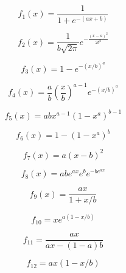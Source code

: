 \documentclass[14pt]{amsart}
\title{}
\author{}
\begin{document}

\clearpage
\vspace{-2in}
$$
f_1(x) = \frac{1}{1+e^{-(ax+b)}}
$$
\clearpage

\vspace{-2in}
$$
f_2(x) = \frac{1}{b \sqrt{2\pi}}e^{-\frac{(x-a)^2}{2b^2}}
$$
\clearpage

\vspace{-2in}

$$
f_3(x) = 1-e^{-(x/b)^a}
$$
\clearpage

\vspace{-2in}
$$
f_4(x) = \frac{a}{b}\left(\frac{x}{b}\right)^{a-1} e^{-(x/b)^a}
$$
\clearpage

\vspace{-2in}
$$
f_5(x) =abx^{a-1}(1-x^a)^{b-1}
$$
\clearpage

\vspace{-2in}
$$
f_6(x) =  1-(1-x^a)^b
$$
\clearpage

\vspace{-2in}
$$
f_7(x) = a(x-b)^2
$$

\clearpage

\vspace{-2in}
$$
f_8(x) = abe^{ax}e^{b}e^{-b e^{ax}}
$$
\clearpage

\vspace{-2in}
$$
f_9(x) = \frac{ax}{1+x/b}
$$
\clearpage

\vspace{-2in}
$$
f_{10} = x e^{a(1-x/b)}
$$
\clearpage

\vspace{-2in}
$$
f_{11}=\frac{ax}{ax-(1-a)b}
$$
\clearpage

\vspace{-2in}
$$
f_{12}=ax(1-x/b)
$$
\clearpage
\end{document}

